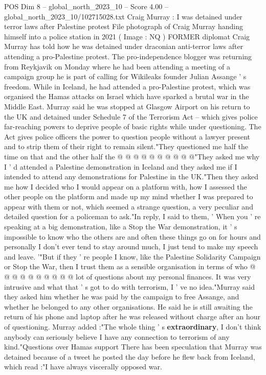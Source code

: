 \begin{textsample}{POS Dim 8 – global\_north\_2023\_10 – Score 4.00 – global\_north\_2023\_10/102715028.txt}  \label{ex:f8_pos_204}
Craig Murray : I was detained under terror laws after Palestine protest File photograph of Craig Murray handing himself into a police station in 2021 ( Image : NQ ) FORMER diplomat Craig Murray has told how he was detained under draconian anti-terror laws after attending a pro-Palestine protest.
The pro-independence blogger was returning from Reykjavik on Monday where he had been attending a meeting of a campaign group he is part of calling for Wikileaks founder Julian Assange ' s freedom.
While in Iceland, he had attended a pro-Palestine protest, which was organised the Hamas attacks on Israel which have sparked a brutal war in the Middle East.
Murray said he was stopped at Glasgow Airport on his return to the UK and detained under Schedule 7 of the Terrorism Act -- which gives police far-reaching powers to deprive people of basic rights while under questioning.
The Act gives police officers the power to question people without a lawyer present and to strip them of their right to remain silent."They questioned me half the time on that and the other half the @ @ @ @ @ @ @ @ @ @"They asked me why I ' d attended a Palestine demonstration in Iceland and they asked me if I intended to attend any demonstrations for Palestine in the UK."Then they asked me how I decided who I would appear on a platform with, how I assessed the other people on the platform and made up my mind whether I was prepared to appear with them or not, which seemed a strange question, a very peculiar and detailed question for a policeman to ask."In reply, I said to them, ' When you ' re speaking at a big demonstration, like a Stop the War demonstration, it ' s impossible to know who the others are and often these things go on for hours and personally I don't ever tend to stay around much, I just tend to make my speech and leave. '"But if they ' re people I know, like the Palestine Solidarity Campaign or Stop the War, then I trust them as a sensible organisation in terms of who @ @ @ @ @ @ @ @ @ @ lot of questions about my personal finances.
It was very intrusive and what that ' s got to do with terrorism, I ' ve no idea."Murray said they asked him whether he was paid by the campaign to free Assange, and whether he belonged to any other organisations.
He said he is still awaiting the return of his phone and laptop after he was released without charge after an hour of questioning.
Murray added :"The whole thing ' s \textbf{extraordinary}, I don't think anybody can seriously believe I have any connection to terrorism of any kind."Questions over Hamas support There has been speculation that Murray was detained because of a tweet he posted the day before he flew back from Iceland, which read :"I have always viscerally opposed war.

\end{textsample}
